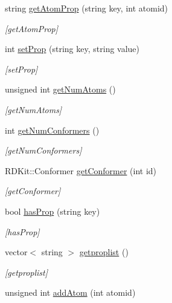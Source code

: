 \begin{DoxyCompactItemize}
string \mbox{\hyperlink{class_molecule_acb057213561817b5e78a1e5e5845ae8f}{get\+Atom\+Prop}} (string key, int atomid)
\begin{DoxyCompactList}\small\item\em \mbox{[}get\+Atom\+Prop\mbox{]} \end{DoxyCompactList}\item 
int \mbox{\hyperlink{class_molecule_a25264008a24371142100f10ab7907d6f}{set\+Prop}} (string key, string value)
\begin{DoxyCompactList}\small\item\em \mbox{[}set\+Prop\mbox{]} \end{DoxyCompactList}\item 
unsigned int \mbox{\hyperlink{class_molecule_a23bfc1c88f4aff43e87af062fe295922}{get\+Num\+Atoms}} ()
\begin{DoxyCompactList}\small\item\em \mbox{[}get\+Num\+Atoms\mbox{]} \end{DoxyCompactList}\item 
int \mbox{\hyperlink{class_molecule_a00c23cd635ca82207165e59cdd714d99}{get\+Num\+Conformers}} ()
\begin{DoxyCompactList}\small\item\em \mbox{[}get\+Num\+Conformers\mbox{]} \end{DoxyCompactList}\item 
R\+D\+Kit\+::\+Conformer \mbox{\hyperlink{class_molecule_ad58d85938153a73ee5f17426474e6a90}{get\+Conformer}} (int id)
\begin{DoxyCompactList}\small\item\em \mbox{[}get\+Conformer\mbox{]} \end{DoxyCompactList}\item 
bool \mbox{\hyperlink{class_molecule_a7168f3faf1d150373c0b8728767d1d4b}{has\+Prop}} (string key)
\begin{DoxyCompactList}\small\item\em \mbox{[}has\+Prop\mbox{]} \end{DoxyCompactList}\item 
vector$<$ string $>$ \mbox{\hyperlink{class_molecule_a5296c86bec78924d64bc2a9472eb91d5}{getproplist}} ()
\begin{DoxyCompactList}\small\item\em \mbox{[}getproplist\mbox{]} \end{DoxyCompactList}\item 
unsigned int \mbox{\hyperlink{class_molecule_a2ef7b76adda28cd4932d07c35d330f71}{add\+Atom}} (int atomid)

\end{DoxyCompactItemize}
